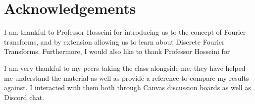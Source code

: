 \documentclass[11pt]{amsart}
\begin{document}
\section*{Acknowledgements}
I am thankful to Professor Hosseini for introducing us to the concept of Fourier transforms, and by extension
allowing us to learn about Discrete Fourier Transforms. Furthermore, I would also like to thank 
Professor Hosseini for 

I am very thankful to my peers taking the class alongside me, they have helped me understand the material as well
as provide a reference to compare my results against. I interacted with them both through Canvas discussion boards
as well as Discord chat. 





\cite{Hunter:2007}
\cite{harris2020array}
\cite{scikit-learn}
\cite{diamond2016cvxpy}
\end{document}
